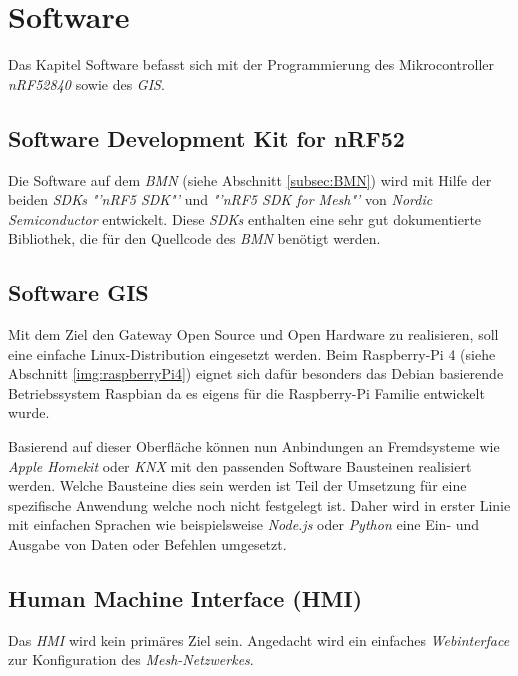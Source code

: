 \clearpage
\section{Software}\label{sec:Software}
Das Kapitel Software befasst sich mit der Programmierung des Mikrocontroller \textit{nRF52840} sowie des \textit{GIS}.

\subsection{Software Development Kit for nRF52}\label{subsec:SDK}
Die Software auf dem \textit{BMN} (siehe Abschnitt \ref{subsec:BMN})  wird mit Hilfe der beiden \textit{SDKs} \textit{"'nRF5 SDK"'}\cite{nordic_semiconductor_nrf5_2019} und \textit{"'nRF5 SDK for Mesh"'}\cite{nordic_semiconductor_nrf5_2019-1} von \textit{Nordic Semiconductor} entwickelt. Diese \textit{SDKs} enthalten eine sehr gut dokumentierte Bibliothek, die für den Quellcode des \textit{BMN} benötigt werden.


\subsection{Software GIS}\label{subsec:SoftwareGIS}
Mit dem Ziel den Gateway Open Source und Open Hardware zu realisieren, soll eine einfache Linux-Distribution eingesetzt werden. Beim Raspberry-Pi 4 (siehe Abschnitt \ref{img:raspberryPi4}) eignet sich dafür besonders das Debian basierende Betriebssystem Raspbian da es eigens für die Raspberry-Pi Familie entwickelt wurde.

Basierend auf dieser Oberfläche können nun Anbindungen an Fremdsysteme wie \textit{Apple Homekit} oder \textit{KNX} mit den passenden Software Bausteinen realisiert werden. Welche Bausteine dies sein werden ist Teil der Umsetzung für eine spezifische Anwendung welche noch nicht festgelegt ist. Daher wird in erster Linie mit einfachen Sprachen wie beispielsweise \textit{Node.js} oder \textit{Python} eine Ein- und Ausgabe von Daten oder Befehlen umgesetzt. 

\subsection{Human Machine Interface (HMI)}\label{subsec:HMI_SW}
Das \textit{HMI} wird kein primäres Ziel sein. Angedacht wird ein einfaches \textit{Webinterface} zur Konfiguration des \textit{Mesh-Netzwerkes}.

